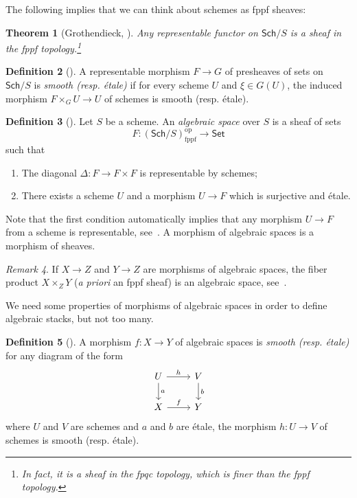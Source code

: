 \documentclass{amsart}
\newtheorem{thm}{Theorem}[section]
\theoremstyle{definition}
\newtheorem{defn}[thm]{Definition}
\theoremstyle{remark}
\newtheorem{rmk}[thm]{Remark}
\theoremstyle{plain}
\theoremstyle{definition}
\theoremstyle{remark}
\newcommand{\mr}[1]{\mathrm{#1}}
\newcommand{\ms}[1]{\mathsf{#1}}
\newcommand{\1}{\mathbf{1}}
\newcommand{\2}{\mathbf{2}}
\newcommand{\3}{\mathbf{3}}
\newcommand{\Sch}{\ms{Sch}}
\newcommand{\fppf}{\mr{fppf}}
\newcommand{\opp}{\mr{op}}
\begin{document}
The following implies that we can think about schemes as fppf sheaves:

\begin{thm}[Grothendieck, {\cite[Theorem 1.3.2]{fganotes}}]
    Any representable functor on $\Sch/S$ is a sheaf in the fppf topology.\footnote{In fact, it is a sheaf in the fpqc topology, which is finer than the fppf topology.}
\end{thm}

\begin{defn}[{\cite[\href{https://stacks.math.columbia.edu/tag/025V}{Tag 025V}]{stacks}}]
    A representable morphism $F \to G$ of presheaves of sets on $\Sch/S$ is \textit{smooth (resp. \'etale)} if for every scheme $U$ and $\xi \in G(U)$, the induced morphism $F \times_G U \to U$ of schemes is smooth (resp. \'etale). 
\end{defn}


\begin{defn}[{\cite[\href{https://stacks.math.columbia.edu/tag/025Y}{Tag 025Y}]{stacks}}]
    Let $S$ be a scheme. An \textit{algebraic space} over $S$ is a sheaf of sets
    \[ F \colon (\Sch/S)^{\opp}_{\fppf} \to \ms{Set} \]
    such that 
    \begin{enumerate}
        \item The diagonal $\Delta \colon F \to F \times F$ is representable by schemes;
        \item There exists a scheme $U$ and a morphism $U \to F$ which is surjective and \'etale.
    \end{enumerate}
    Note that the first condition automatically implies that any morphism $U \to F$ from a scheme is representable, see~\cite[\href{https://stacks.math.columbia.edu/tag/025W}{Tag 025W}]{stacks}. A morphism of algebraic spaces is a morphism of sheaves.
\end{defn}

\begin{rmk}
    If $X \to Z$ and $Y \to Z$ are morphisms of algebraic spaces, the fiber product $X \times_Z Y$ (\textit{a priori} an fppf sheaf) is an algebraic space, see~\cite[\href{https://stacks.math.columbia.edu/tag/04T9}{Tag 04T9}]{stacks}.
\end{rmk}

We need some properties of morphisms of algebraic spaces in order to define algebraic stacks, but not too many.

\begin{defn}[{\cite[\href{https://stacks.math.columbia.edu/tag/03MJ}{Tag 03MJ}, \href{https://stacks.math.columbia.edu/tag/04R3}{Tag 04R3}]{stacks}}]
    A morphism $f \colon X \to Y$ of algebraic spaces is \textit{smooth (resp. \'etale)} for any diagram of the form
    \begin{equation*}
    \begin{tikzcd}
        U \ar{r}{h} \ar{d}{a} & V \ar{d}{b} \\
        X \ar{r}{f} & Y
    \end{tikzcd}
    \end{equation*}
    where $U$ and $V$ are schemes and $a$ and $b$ are \'etale, the morphism $h \colon U \to V$ of schemes is smooth (resp. \'etale).
\end{defn}
\end{document}
